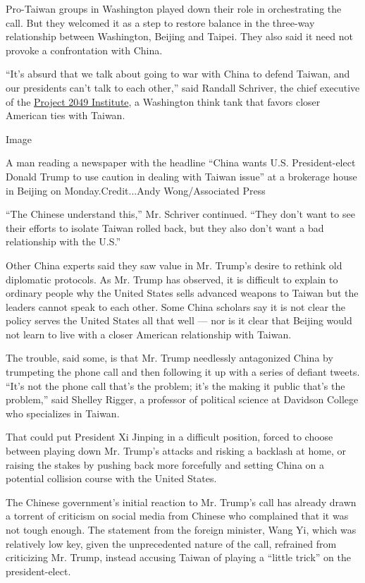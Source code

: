 Pro-Taiwan groups in Washington played down their role in orchestrating
the call. But they welcomed it as a step to restore balance in the
three-way relationship between Washington, Beijing and Taipei. They also
said it need not provoke a confrontation with China.

``It's absurd that we talk about going to war with China to defend
Taiwan, and our presidents can't talk to each other,'' said Randall
Schriver, the chief executive of the
\href{http://project2049.net/}{Project 2049 Institute}, a Washington
think tank that favors closer American ties with Taiwan.

Image

A man reading a newspaper with the headline ``China wants U.S.
President-elect Donald Trump to use caution in dealing with Taiwan
issue'' at a brokerage house in Beijing on Monday.Credit...Andy
Wong/Associated Press

``The Chinese understand this,'' Mr. Schriver continued. ``They don't
want to see their efforts to isolate Taiwan rolled back, but they also
don't want a bad relationship with the U.S.''

Other China experts said they saw value in Mr. Trump's desire to rethink
old diplomatic protocols. As Mr. Trump has observed, it is difficult to
explain to ordinary people why the United States sells advanced weapons
to Taiwan but the leaders cannot speak to each other. Some China
scholars say it is not clear the policy serves the United States all
that well --- nor is it clear that Beijing would not learn to live with
a closer American relationship with Taiwan.

The trouble, said some, is that Mr. Trump needlessly antagonized China
by trumpeting the phone call and then following it up with a series of
defiant tweets. ``It's not the phone call that's the problem; it's the
making it public that's the problem,'' said Shelley Rigger, a professor
of political science at Davidson College who specializes in Taiwan.

That could put President Xi Jinping in a difficult position, forced to
choose between playing down Mr. Trump's attacks and risking a backlash
at home, or raising the stakes by pushing back more forcefully and
setting China on a potential collision course with the United States.

The Chinese government's initial reaction to Mr. Trump's call has
already drawn a torrent of criticism on social media from Chinese who
complained that it was not tough enough. The statement from the foreign
minister, Wang Yi, which was relatively low key, given the unprecedented
nature of the call, refrained from criticizing Mr. Trump, instead
accusing Taiwan of playing a ``little trick'' on the president-elect.

